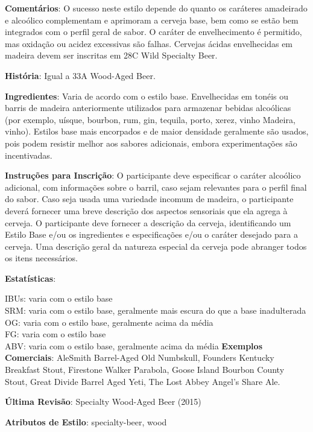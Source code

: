 \textbf{Comentários}: O sucesso neste estilo depende do quanto os caráteres amadeirado e alcoólico complementam e aprimoram a cerveja base, bem como se estão bem integrados com o perfil geral de sabor. O caráter de envelhecimento é permitido, mas oxidação ou acidez excessivas são falhas. Cervejas ácidas envelhecidas em madeira devem ser inscritas em 28C Wild Specialty Beer.

\textbf{História}: Igual a 33A Wood-Aged Beer.

\textbf{Ingredientes}: Varia de acordo com o estilo base. Envelhecidas em tonéis ou barris de madeira anteriormente utilizados para armazenar bebidas alcoólicas (por exemplo, uísque, bourbon, rum, gin, tequila, porto, xerez, vinho Madeira, vinho). Estilos base mais encorpados e de maior densidade geralmente são usados, pois podem resistir melhor aos sabores adicionais, embora experimentações são incentivadas.

\textbf{Instruções para Inscrição}: O participante deve especificar o caráter alcoólico adicional, com informações sobre o barril, caso sejam relevantes para o perfil final do sabor. Caso seja usada uma variedade incomum de madeira, o participante deverá fornecer uma breve descrição dos aspectos sensoriais que ela agrega à cerveja. O participante deve fornecer a descrição da cerveja, identificando um Estilo Base e/ou os ingredientes e especificações e/ou o caráter desejado para a cerveja. Uma descrição geral da natureza especial da cerveja pode abranger todos os itens necessários.

\textbf{Estatísticas}:

IBUs: varia com o estilo base\\
SRM: varia com o estilo base, geralmente mais escura do que a base inadulterada\\
OG: varia com o estilo base, geralmente acima da média\\
FG: varia com o estilo base\\
ABV: varia com o estilo base, geralmente acima da média
\textbf{Exemplos Comerciais}: AleSmith Barrel-Aged Old Numbskull, Founders Kentucky Breakfast Stout, Firestone Walker Parabola, Goose Island Bourbon County Stout, Great Divide Barrel Aged Yeti, The Lost Abbey Angel’s Share Ale.

\textbf{Última Revisão}: Specialty Wood-Aged Beer (2015)

\textbf{Atributos de Estilo}: specialty-beer, wood
